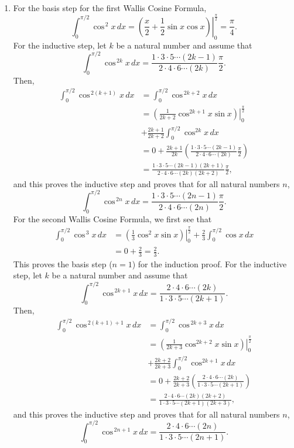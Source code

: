 \begin{enumerate}
\begin{enumerate}
\item For the basis step for the first Wallis Cosine Formula,
\[
\int_{0}^{\pi/2} \cos^{\,2} x \, dx = \left( \left. \frac{x}{2} + \frac{1}{2} \sin x \cos x \right) \right|_0^{\frac{\pi}{2}} = \dfrac{\pi}{4}.
\]
For the inductive step, let $k$ be a natural number and assume that
\[
\int_{0}^{\pi/2} \cos^{\,2k}x \, dx = \frac{1 \cdot 3 \cdot 5 \cdots (2k - 1)}{2 \cdot 4 \cdot 6 \cdots (2k)} \frac{\pi}{2}.
\]
Then,
\begin{align*}
\int_{0}^{\pi/2} \cos^{\,2(k+1)}x \, dx &= \int_{0}^{\pi/2} \cos^{\,2k + 2}x \, dx \\
  &= \left( \left. \frac{1}{2k + 2} \cos^{2k+1}x \sin x \right) \right|_0^{\frac{\pi}{2}} \\ &+ \frac{2k+1}{2k+2} \int_{0}^{\pi/2} \cos^{2k}x \, dx \\
  &= 0 + \frac{2k+1}{2k} \left(\frac{1 \cdot 3 \cdot 5 \cdots (2k - 1)}{2 \cdot 4 \cdot 6 \cdots (2k)} \frac{\pi}{2} \right) \\
  &= \frac{1 \cdot 3 \cdot 5 \cdots (2k - 1)(2k + 1)}{2 \cdot 4 \cdot 6 \cdots (2k)(2k + 2)} \frac{\pi}{2},
\end{align*}
and this proves the inductive step and proves that for all natural numbers $n$,
\[
\int_{0}^{\pi/2} \cos^{\,2n}x \, dx = \frac{1 \cdot 3 \cdot 5 \cdots (2n - 1)}{2 \cdot 4 \cdot 6 \cdots (2n)} \frac{\pi}{2}.
\]
For the second Wallis Cosine Formula, we first see that
\begin{align*}
\int_{0}^{\pi/2} \cos^{\,3} x \, dx &= \left( \left. \frac{1}{3} \cos^{2}x \sin x \right) \right|_0^{\frac{\pi}{2}} + \frac{2}{3} \int_{0}^{\pi/2} \cos x \, dx  \\
             &= 0 + \frac{2}{3} = \frac{2}{3}.
\end{align*}
This proves the basis step ($n = 1$) for the induction proof.  For the inductive step, let $k$ be a natural number and assume that
\[
\int_{0}^{\pi/2} \cos^{\,2k+1}x \, dx = \frac{2 \cdot 4 \cdot 6 \cdots (2k)}{1 \cdot 3 \cdot 5 \cdots (2k + 1)}.
\]
Then,
\begin{align*}
\int_{0}^{\pi/2} \cos^{\,2(k+1) + 1}x \, dx &= \int_{0}^{\pi/2} \cos^{\,2k + 3}x \, dx \\
  &= \left( \left. \frac{1}{2k + 3} \cos^{2k+2}x \sin x \right) \right|_0^{\frac{\pi}{2}} \\ &+ \frac{2k+2}{2k+3} \int_{0}^{\pi/2} \cos^{2k+1}x \, dx \\
  &= 0 + \frac{2k+2}{2k+3} \left(\frac{2 \cdot 4 \cdot 6 \cdots (2k)}{1 \cdot 3 \cdot 5 \cdots (2k+1)} \right) \\
  &= \frac{2 \cdot 4 \cdot 6 \cdots (2k)(2k + 2)}{1 \cdot 3 \cdot 5 \cdots (2k+1)(2k + 3)},
\end{align*}
and this proves the inductive step and proves that for all natural numbers $n$,
\[
\int_{0}^{\pi/2} \cos^{\,2n+1}x \, dx = \frac{2 \cdot 4 \cdot 6 \cdots (2n)}{1 \cdot 3 \cdot 5 \cdots (2n + 1)}.
\]
\end{enumerate}



\end{enumerate}

